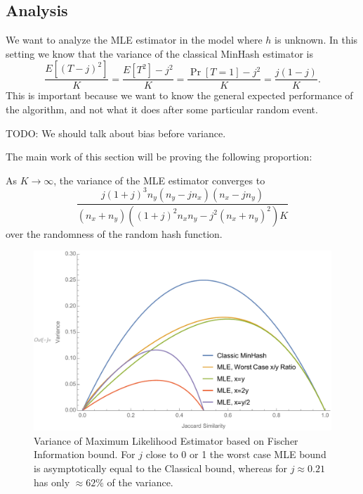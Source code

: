 \subsection{Analysis}

We want to analyze the MLE estimator in the model where $h$ is unknown.
In this setting we know that the variance of the classical MinHash estimator is
\[
   \frac{E[(T-j)^2]}{K}
      = \frac{E[T^2] - j^2}{K}
      = \frac{\Pr[T=1] - j^2}{K}
= \frac{j(1-j)}{K}.
\]
This is important because we want to know the general expected performance of the algorithm, and not what it does after some particular random event.

TODO: We should talk about bias before variance.

The main work of this section will be proving the following proportion:
\begin{proposition}\label{prop:mle_var}
   As $K\to\infty$, the variance of the MLE estimator converges to
   \[
      \frac{j (1+j)^3 n_y (n_y-j n_x) (n_x-j n_y)}{(n_x+n_y) \left((1+j)^2 n_xn_y - j^2 (n_x+n_y)^2\right)K}
   \label{eq:mle_var}
   \]
   over the randomness of the random hash function.
\end{proposition}

\begin{figure}
\includegraphics[trim=30 0 0 0,clip,width=\linewidth]{figures/mle_variance2}
\caption{Variance of Maximum Likelihood Estimator based on Fischer Information bound.
For $j$ close to 0 or 1 the worst case MLE bound is asymptotically equal to the Classical bound, whereas for $j\approx 0.21$ has only $\approx 62\%$ of the variance.}
\label{fig:mle_variance}
\end{figure}

